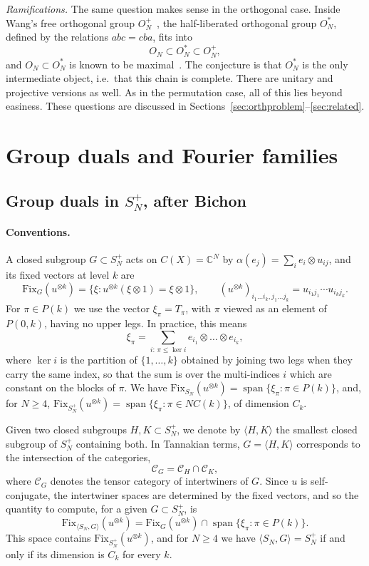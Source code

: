 \documentclass[11pt]{amsart}
\theoremstyle{definition}
\theoremstyle{remark}
\theoremstyle{plain}
\numberwithin{equation}{section}
\numberwithin{table}{section}
\newcommand{\C}{\mathbb C}
\newcommand{\Fix}{\mathrm{Fix}}
\DeclareMathOperator{\spn}{span}
\begin{document}
\emph{Ramifications.} The same question makes sense in the orthogonal case. Inside Wang's free orthogonal group $O_N^+$~\cite{wa95}, the half-liberated orthogonal group $O_N^*$, defined by the relations $abc=cba$, fits into
\[
O_N\subset O_N^*\subset O_N^+ ,
\]
and $O_N\subset O_N^*$ is known to be maximal~\cite{bbcc}. The conjecture is that $O_N^*$ is the only intermediate object, i.e.\ that this chain is complete. There are unitary and projective versions as well. As in the permutation case, all of this lies beyond easiness. These questions are discussed in Sections~\ref{sec:orthproblem}--\ref{sec:related}.



\section{Group duals and Fourier families}\label{sec:duals}

\subsection{Group duals in $S_N^+$, after Bichon}\label{sec:bichon}

\paragraph{Conventions.}
A closed subgroup $G\subset S_N^+$ acts on $C(X)=\C^N$ by $\alpha(e_j)=\sum_ie_i\otimes u_{ij}$, and its fixed vectors at level $k$ are
\[
\Fix_G(u^{\otimes k})=\{\xi:u^{\otimes k}(\xi\otimes1)=\xi\otimes1\},\qquad (u^{\otimes k})_{i_1\dots i_k,j_1\dots j_k}=u_{i_1j_1}\cdots u_{i_kj_k}.
\]
For $\pi\in P(k)$ we use the vector $\xi_\pi=T_\pi$, with $\pi$ viewed as an element of $P(0,k)$, having no upper legs. In practice, this means
\[
\xi_\pi=\sum_{i:\,\pi\le\ker i}e_{i_1}\otimes\dots\otimes e_{i_k},
\]
where $\ker i$ is the partition of $\{1,\dots,k\}$ obtained by joining two legs when they carry the same index, so that the sum is over the multi-indices $i$ which are constant on the blocks of $\pi$. We have $\Fix_{S_N}(u^{\otimes k})=\spn\{\xi_\pi:\pi\in P(k)\}$, and, for $N\ge4$, $\Fix_{S_N^+}(u^{\otimes k})=\spn\{\xi_\pi:\pi\in NC(k)\}$, of dimension $C_k$.

Given two closed subgroups $H,K\subset S_N^+$, we denote by $\langle H,K\rangle$ the smallest closed subgroup of $S_N^+$ containing both. In Tannakian terms, $G=\langle H,K\rangle$ corresponds to the intersection of the categories,
\[
\mathcal C_G=\mathcal C_H\cap\mathcal C_K,
\]
where $\mathcal C_G$ denotes the tensor category of intertwiners of $G$. Since $u$ is self-conjugate, the intertwiner spaces are determined by the fixed vectors, and so the quantity to compute, for a given $G\subset S_N^+$, is
\[
\Fix_{\langle S_N,G\rangle}(u^{\otimes k})=\Fix_G(u^{\otimes k})\cap\spn\{\xi_\pi:\pi\in P(k)\}.
\]
This space contains $\Fix_{S_N^+}(u^{\otimes k})$, and for $N\ge4$ we have $\langle S_N,G\rangle=S_N^+$ if and only if its dimension is $C_k$ for every $k$.
\end{document}
